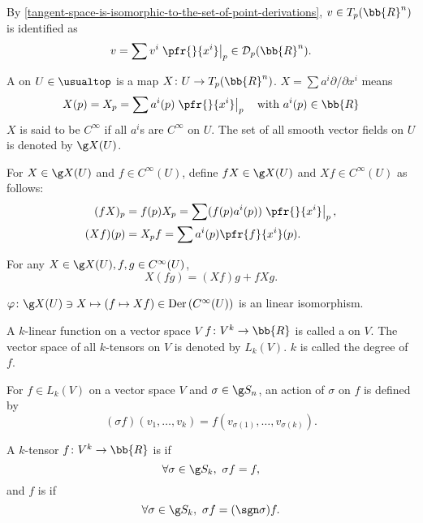 By \ref{tangent-space-is-isomorphic-to-the-set-of-point-derivations}, $v \in T_p(\bb{R}^n)$ is identified as
\[
v = \sum v^i \left.\pfr{}{x^i}\right|_p \in \mathcal{D}_p(\bb{R}^n).
\]

A  on $U \in \usualtop$ is a map $X \colon U \to T_p(\bb{R}^n)$. $X = \sum a^i \partial / \partial x^i$ means
\[
X(p) = X_p = \sum a^i(p) \left. \pfr{}{x^i} \right|_p \quad \text{with } a^i (p) \in \bb{R}
\]
$X$ is said to be $C^\infty$ if all $a^i$s are $C^\infty$ on $U$. The set of all smooth vector fields on $U$ is denoted by $\g X(U)$.

For $X \in \g X(U)$ and $f \in C^\infty(U)$, define $fX \in \g X(U)$ and $Xf \in C^\infty(U)$ as follows:
\begin{align*}
(fX)_p &= f(p)X_p = \sum (f(p)a^i(p)) \left. \pfr{}{x^i}\right|_p,\\
(Xf)(p) &= X_p f = \sum a^i (p) \pfr{f}{x^i} (p).
\end{align*}

For any $X \in \g X(U), f, g \in C^\infty(U)$,
\[
X(fg) = (Xf)g + fXg.
\]

$\varphi \colon \g X(U) \ni X \mapsto (f \mapsto Xf) \in \mathrm{Der}\, (C^\infty(U))$ is an linear isomorphism.

A $k$-linear function on a vector space $V$ $f \colon V^k \to \bb{R}$ is called a  on $V$. The vector space of all $k$-tensors on $V$ is denoted by $L_k(V)$. $k$ is called the degree of $f$.

For $f \in L_k(V)$ on a vector space $V$ and $\sigma \in \g S_n$, an action of $\sigma $ on $f$ is defined by
\[
(\sigma f)(v_1, \dotsc, v_k) = f(v_{\sigma(1)},\dotsc, v_{\sigma(k)}).
\]

A $k$-tensor $f \colon V^k \to \bb{R}$ is  if
\[
\forall \sigma \in \g S_k,\ \sigma f  =f,
\]
and $f$ is  if
\[
\forall \sigma \in \g S_k,\ \sigma f = (\sgn \sigma) f.
\]

